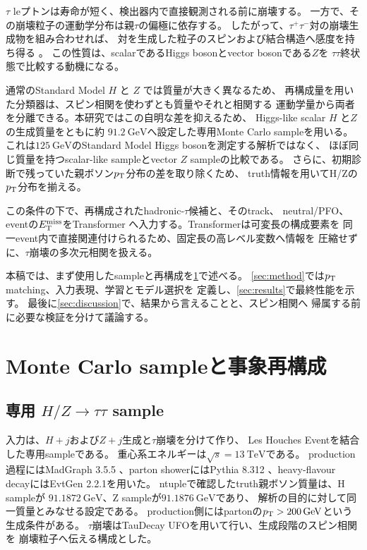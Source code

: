 \documentclass[xelatex,ja=standard,a4paper,10pt,twocolumn]{bxjsarticle}
\begin{document}
\(\tau\) leプトンは寿命が短く、検出器内で直接観測される前に崩壊する。
一方で、その崩壊粒子の運動学分布は親\(\tau\)の偏極に依存する。
したがって、\(\tau^{+}\tau^{-}\)対の崩壊生成物を組み合わせれば、
対を生成した粒子のスピンおよび結合構造へ感度を持ち得る
\cite{TauSpinner,TauSpinML}。
この性質は、scalarであるHiggs bosonとvector bosonである\(Z\)を
\(\tau\tau\)終状態で比較する動機になる。

通常のStandard Model \(H\) と \(Z\) では質量が大きく異なるため、
再構成量を用いた分類器は、スピン相関を使わずとも質量やそれと相関する
運動学量から両者を分離できる。本研究ではこの自明な差を抑えるため、
Higgs-like scalar \(H\) と\(Z\)の生成質量をともに約
\(\SI{91.2}{\GeV}\)へ設定した専用Monte Carlo sampleを用いる。
これは\(\SI{125}{\GeV}\)のStandard Model Higgs bosonを測定する解析ではなく、
ほぼ同じ質量を持つscalar-like sampleとvector \(Z\) sampleの比較である。
さらに、初期診断で残っていた親ボソン\(p_{\mathrm{T}}\)分布の差を取り除くため、
truth情報を用いてH/Zの\(p_{\mathrm{T}}\)分布を揃える。

この条件の下で、再構成されたhadronic-\(\tau\)候補と、そのtrack、
neutral/PFO、eventの\(E_{\mathrm{T}}^{\mathrm{miss}}\)をTransformer
\cite{Transformer}へ入力する。Transformerは可変長の構成要素を
同一event内で直接関連付けられるため、固定長の高レベル変数へ情報を
圧縮せずに、\(\tau\)崩壊の多次元相関を扱える。

本稿では、まず使用したsampleと再構成を\cref{sec:samples}で述べる。
\cref{sec:method}では\(p_{\mathrm{T}}\) matching、入力表現、学習とモデル選択を
定義し、\cref{sec:results}で最終性能を示す。
最後に\cref{sec:discussion}で、結果から言えることと、スピン相関へ
帰属する前に必要な検証を分けて議論する。

\section{Monte Carlo sampleと事象再構成}
\label{sec:samples}

\subsection{専用 \(H/Z\rightarrow\tau\tau\) sample}

入力は、\(H+j\)および\(Z+j\)生成と\(\tau\)崩壊を分けて作り、
Les Houches Eventを結合した専用sampleである。
重心系エネルギーは\(\sqrt{s}=\SI{13}{\TeV}\)である。
production過程にはMadGraph 3.5.5
\cite{MadGraph5}、parton showerにはPythia 8.312
\cite{Pythia82}、heavy-flavour decayにはEvtGen 2.2.1を用いた。
ntupleで確認したtruth親ボソン質量は、H sampleが
\(\SI{91.1872}{\GeV}\)、Z sampleが\(\SI{91.1876}{\GeV}\)であり、
解析の目的に対して同一質量とみなせる設定である。
production側にはpartonの\(\pt>\SI{200}{\GeV}\)という生成条件がある。
\(\tau\)崩壊はTauDecay UFOを用いて行い、生成段階のスピン相関を
崩壊粒子へ伝える構成とした。
\end{document}
